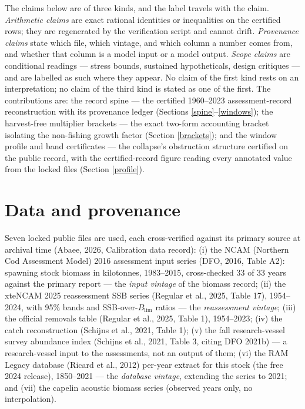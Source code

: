 \documentclass[10pt,twocolumn]{article}
\theoremstyle{plain}
\theoremstyle{remark}
\begin{document}
The claims below are of three kinds, and the label travels with the
claim. \emph{Arithmetic claims} are exact rational identities or
inequalities on the certified rows; they are regenerated by the
verification script and cannot drift. \emph{Provenance claims} state
which file, which vintage, and which column a number comes from, and
whether that column is a model input or a model output. \emph{Scope
claims} are conditional readings --- stress bounds, sustained
hypotheticals, design critiques --- and are labelled as such where
they appear. No claim of the first kind rests on an interpretation; no
claim of the third kind is stated as one of the first. The
contributions are: the record spine --- the certified 1960--2023
assessment-record reconstruction with its provenance ledger (Sections
\ref{spine}--\ref{windows}); the harvest-free multiplier brackets ---
the exact two-form accounting bracket isolating the non-fishing growth
factor (Section \ref{brackets}); and the window profile and band
certificates --- the collapse's obstruction structure certified on the
public record, with the certified-record figure reading every annotated
value from the locked files (Section \ref{profile}).

\section{Data and provenance}\label{data}

Seven locked public files are used, each cross-verified against its
primary source at archival time (Abaee, 2026, Calibration data record): (i) the NCAM (Northern Cod Assessment Model) 2016
assessment input series (DFO, 2016, Table A2): spawning stock biomass
in kilotonnes, 1983--2015, cross-checked 33 of 33 years against the
primary report --- the \emph{input vintage} of the biomass record;
(ii) the xteNCAM 2025 reassessment SSB series (Regular et al., 2025,
Table 17), 1954--2024, with 95\% bands and SSB-over-\(B_{\mathrm{lim}}\)
ratios --- the \emph{reassessment vintage}; (iii) the official
removals table (Regular et al., 2025, Table 1), 1954--2023; (iv) the
catch reconstruction (Schijns et al., 2021, Table 1); (v) the fall
research-vessel survey abundance index (Schijns et al., 2021, Table 3,
citing DFO 2021b) --- a research-vessel input to the assessments, not
an output of them; (vi) the RAM Legacy database (Ricard et al., 2012)
per-year extract for this stock (the free 2024 release), 1850--2021 --- the \emph{database
vintage}, extending the series to 2021; and (vii) the capelin acoustic
biomass series (observed years only, no interpolation).
\end{document}
